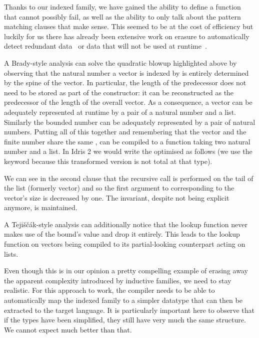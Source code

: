 \documentclass{article}
\newcommand{\idris}{Idris 2}
\begin{document}
Thanks to our indexed family, we have gained the ability to define a function that cannot
possibly fail, as well as the ability to only talk about the pattern matching clauses
that make sense.
This seemed to be at the cost of efficiency but luckily for us there has already been
extensive work on erasure to automatically detect redundant
data~\cite{DBLP:conf/types/BradyMM03} or data that will not be used at
runtime~\cite{DBLP:journals/pacmpl/Tejiscak20}.

A Brady-style analysis can solve the quadratic blowup highlighted above by observing
that the natural number a vector is indexed by is entirely determined by the spine of
the vector. In particular, the length of the predecessor does not need to be stored
as part of the constructor: it can be reconstructed as the predecessor of the length
of the overall vector. As a consequence, a vector can be adequately represented at
runtime by a pair of a natural number and a list. Similarly the bounded number can be
adequately represented by a pair of natural numbers. Putting all of this together and
remembering that the vector and the finite number share the same ,
 can be compiled to a function taking two natural number and a list.
In \idris{} we would write the optimised  as follows (we use the
 keyword because this transformed version is not total at that type).


We can see in the second clause that the recursive call is performed on the tail of
the list (formerly vector) and so the first argument to 
corresponding to the vector's size is decreased by one. The invariant, despite not
being explicit anymore, is maintained.

A Tejiščák-style analysis can additionally notice that the lookup function never makes
use of the bound's value and drop it entirely. This leads to the lookup function on
vectors being compiled to its partial-looking counterpart acting on lists.


Even though this is in our opinion a pretty compelling example of erasing away the
apparent complexity introduced by inductive families, we need to stay
realistic.
%
For this approach to work, the compiler needs to be able to automatically map the
indexed family to a simpler datatype that can then be extracted to the target language.
%
It is particularly important here to observe that if the types have been simplified,
they still have very much the same structure. We cannot expect much better than that.
\end{document}
